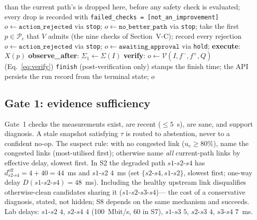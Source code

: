 \documentclass[conference]{IEEEtran}
\begin{document}
\begin{algorithm}[t]
\begin{algorithmic}[1]
  than the current path's is dropped here, before any safety check is
  evaluated; every drop is recorded with
  \texttt{failed\_checks = [not\_an\_improvement]}
  \State $o\gets\texttt{action\_rejected}$ via \texttt{stop}; \Return
\EndIf
{}
  \State $o\gets\texttt{no\_better\_path}$ via \texttt{stop}; \Return
\EndIf
\State take the first $p\in\mathcal{P}_c$ that $V$ admits (the nine checks
  of Section~V-C); record every rejection
  \State $o\gets\texttt{action\_rejected}$ via \texttt{stop}; \Return
{}
  \State $o\gets\texttt{awaiting\_approval}$ via \texttt{hold}; \Return
\Else
  \State \textbf{execute}: $X(p)$ 
  \State \textbf{observe\_after}: $\Sigma_1\gets\Sigma(I)$ 
  \State \textbf{verify}: $o\gets\mathcal{V}(I,f^-,f^+,Q)$
    (Eq.~\eqref{eq:verify}) 
\EndIf
\State \texttt{finish} (post-verification only) stamps the finish time;
  the API persists the run record from the terminal state; \Return $o$
\end{algorithmic}
\end{algorithm}

\subsection{Gate 1: evidence sufficiency}

Gate~1 checks the measurements exist, are recent ($\le 5$~s), are sane, and
support diagnosis. A stale snapshot satisfying $\tau$ is routed to
abstention, never to a confident no-op. The suspect rule: with no congested
link ($u_e\ge 80\%$), name the congested links (most-utilised first);
otherwise name \emph{all} current-path links by effective delay, slowest
first. In S2 the degraded path $s1$-$s2$-$s4$ has
$d^{\mathrm{eff}}_{s2\text{-}s4}=4+40=44$~ms and $s1$-$s2$ $4$~ms (set
$\{s2\text{-}s4,s1\text{-}s2\}$, slowest first; one-way delay
$D(s1\text{-}s2\text{-}s4)=48$~ms). Including the healthy upstream link
disqualifies otherwise-clean candidates sharing it ($s1$-$s2$-$s3$-$s4$)---
the cost of a conservative diagnosis, stated, not hidden; S8 depends on the
same mechanism and succeeds. Lab delays: $s1$-$s2$ $4$, $s2$-$s4$ $4$
(100~Mbit/s, $60$ in S7), $s1$-$s3$ $5$, $s2$-$s3$ $4$, $s3$-$s4$ $7$~ms.
\end{document}
